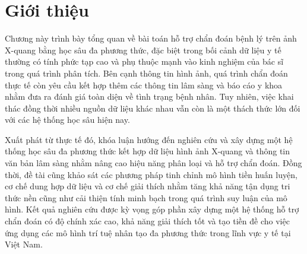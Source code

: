 \chapter{Giới thiệu}
Chương này trình bày tổng quan về bài toán hỗ trợ chẩn đoán bệnh lý trên ảnh X-quang bằng học sâu đa phương thức, đặc biệt trong bối cảnh dữ liệu y tế thường có tính phức tạp cao và phụ thuộc mạnh vào kinh nghiệm của bác sĩ trong quá trình phân tích. Bên cạnh thông tin hình ảnh, quá trình chẩn đoán thực tế còn yêu cầu kết hợp thêm các thông tin lâm sàng và báo cáo y khoa nhằm đưa ra đánh giá toàn diện về tình trạng bệnh nhân. Tuy nhiên, việc khai thác đồng thời nhiều nguồn dữ liệu khác nhau vẫn còn là một thách thức lớn đối với các hệ thống học sâu hiện nay.

Xuất phát từ thực tế đó, khóa luận hướng đến nghiên cứu và xây dựng một hệ thống học sâu đa phương thức kết hợp dữ liệu hình ảnh X-quang và thông tin văn bản lâm sàng nhằm nâng cao hiệu năng phân loại và hỗ trợ chẩn đoán. Đồng thời, đề tài cũng khảo sát các phương pháp tinh chỉnh mô hình tiền huấn luyện, cơ chế dung hợp dữ liệu và cơ chế giải thích nhằm tăng khả năng tận dụng tri thức nền cũng như cải thiện tính minh bạch trong quá trình suy luận của mô hình. Kết quả nghiên cứu được kỳ vọng góp phần xây dựng một hệ thống hỗ trợ chẩn đoán có độ chính xác cao, khả năng giải thích tốt và tạo tiền đề cho việc ứng dụng các mô hình trí tuệ nhân tạo đa phương thức trong lĩnh vực y tế tại Việt Nam.
\label{Chapter1}



